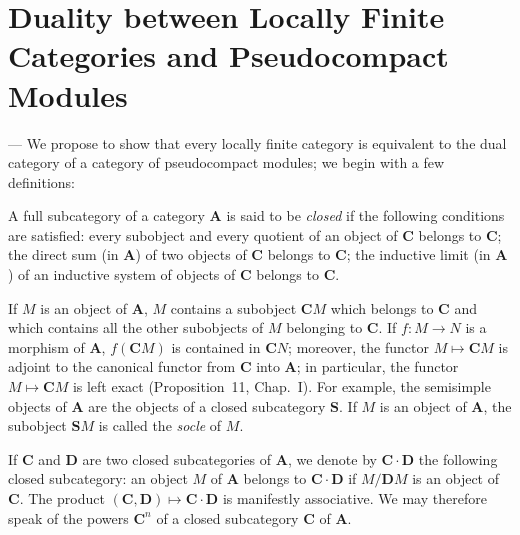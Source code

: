 %
%

\section{Duality between Locally Finite Categories and Pseudocompact Modules}

--- We propose to show that every locally finite category is equivalent
to the dual category of a category of pseudocompact modules; we begin
with a few definitions:

A full subcategory of a category $\mathbf{A}$ is said to be
\emph{closed} if the following conditions are satisfied: every
subobject and every quotient of an object of $\mathbf{C}$ belongs to
$\mathbf{C}$; the direct sum (in $\mathbf{A}$) of two objects of
$\mathbf{C}$ belongs to $\mathbf{C}$; the inductive limit (in
$\mathbf{A}$) of an inductive system of objects of $\mathbf{C}$ belongs
to $\mathbf{C}$.

If $M$ is an object of $\mathbf{A}$, $M$ contains a subobject
$\mathbf{C}M$ which belongs to $\mathbf{C}$ and which contains all the
other subobjects of $M$ belonging to $\mathbf{C}$. If $f\colon M\to N$
is a morphism of $\mathbf{A}$, $f(\mathbf{C}M)$ is contained in
$\mathbf{C}N$; moreover, the functor $M\mapsto\mathbf{C}M$ is adjoint
to the canonical functor from $\mathbf{C}$ into $\mathbf{A}$; in
particular, the functor $M\mapsto\mathbf{C}M$ is left exact
(Proposition~11, Chap.~I). For example, the semisimple objects of
$\mathbf{A}$ are the objects of a closed subcategory $\mathbf{S}$. If
$M$ is an object of $\mathbf{A}$, the subobject $\mathbf{S}M$ is called
the \emph{socle} of $M$.

If $\mathbf{C}$ and $\mathbf{D}$ are two closed subcategories of
$\mathbf{A}$, we denote by $\mathbf{C}\cdot\mathbf{D}$ the following
closed subcategory: an object $M$ of $\mathbf{A}$ belongs to
$\mathbf{C}\cdot\mathbf{D}$ if $M/\mathbf{D}M$ is an object of
$\mathbf{C}$. The product
$(\mathbf{C},\mathbf{D})\mapsto\mathbf{C}\cdot\mathbf{D}$ is manifestly
associative. We may therefore speak of the powers $\mathbf{C}^n$ of a
closed subcategory $\mathbf{C}$ of $\mathbf{A}$.

